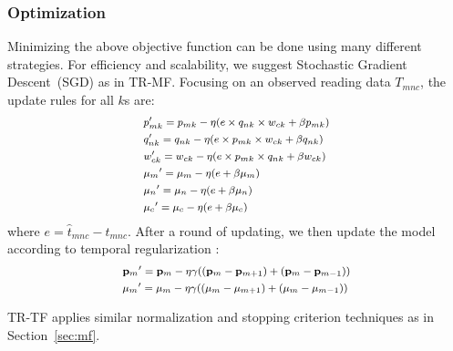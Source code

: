 \subsubsection{Optimization}
Minimizing the above objective function can be done using many different strategies.
For efficiency and scalability, we suggest Stochastic Gradient Descent~(SGD) as in TR-MF.
Focusing on an observed reading data $T_{mnc} $, the update rules for all $k$s are:
\begin{equation*}
\small
\begin{aligned}
  &p_{mk}^\prime=p_{mk}-\eta(e\times q_{nk}\times w_{ck} + \beta p_{mk})
\\&q_{nk}^\prime=q_{nk}-\eta(e\times p_{mk}\times w_{ck} + \beta q_{nk})
\\&w_{ck}^\prime=w_{ck}-\eta(e\times p_{mk}\times q_{nk} + \beta w_{ck})
\\&{\mu_m}^\prime=\mu_m-\eta(e+\beta\mu_m)
\\&{\mu_n}^\prime=\mu_n-\eta(e+\beta\mu_n)
\\&{\mu_c}^\prime=\mu_c-\eta(e+\beta\mu_c)
\end{aligned}
\end{equation*}
where $e=\hat{t}_{mnc}-t_{mnc}$. After a round of updating, we then update the model according to temporal regularization :
\begin{equation*}
\small
\begin{aligned}
&{\mathbf{p}_m}^\prime={\mathbf{p}_m}-\eta\gamma((\mathbf{p}_m-\mathbf{p}_{m+1})+(\mathbf{p}_m-\mathbf{p}_{m-1}))
\\&{\mu_m}^\prime=\mu_m-\eta\gamma((\mu_m-\mu_{m+1})+(\mu_m-\mu_{m-1}))
\end{aligned}
\end{equation*}

TR-TF applies similar normalization and stopping criterion techniques as in Section~\ref{sec:mf}.
